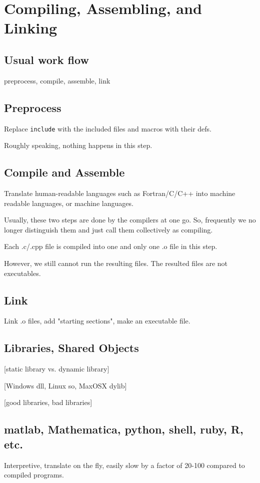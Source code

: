 \documentclass[main]{subfiles}
\begin{document}
\section{Compiling, Assembling, and Linking}
\subsection{Usual work flow}
preprocess, compile, assemble, link
\subsection{Preprocess}
Replace \texttt{include} with the included files and macros with their defs.

Roughly speaking, nothing happens in this step.
\subsection{Compile and Assemble}
Translate human-readable languages such as Fortran/C/C++ into machine readable
languages, or machine languages.

Usually, these two steps are done by the compilers at one go. So, frequently we
no longer distinguish them and just call them collectively as compiling.

Each .c/.cpp file is compiled into one and only one .o file in this step.

However, we still cannot run the resulting files. The resulted files are not
executables.
\subsection{Link}
Link .o files, add "starting sections", make an executable file.

\subsection{Libraries, Shared Objects}
[static library vs. dynamic library]

[Windows dll, Linux so, MaxOSX dylib]

[good libraries, bad libraries]

\subsection{matlab, Mathematica, python, shell, ruby, R, etc.}
Interpretive, translate on the fly, easily slow by a factor of 20-100 compared
to compiled programs.
\end{document}

